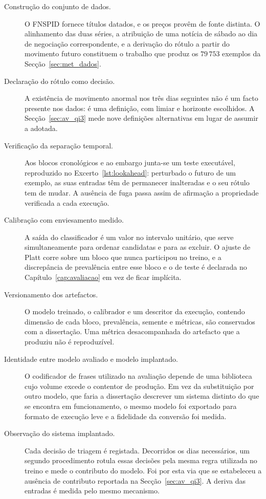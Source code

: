 \begin{description}
  \item[Construção do conjunto de dados.] O \gls{FNSPID} fornece títulos datados, e os preços
        provêm de fonte distinta. O alinhamento das duas séries, a atribuição de uma notícia de
        sábado ao dia de negociação correspondente, e a derivação do rótulo a partir do movimento
        futuro constituem o trabalho que produz os $79\,753$ exemplos da
        Secção~\ref{sec:met_dados}.

  \item[Declaração do rótulo como decisão.] A existência de movimento anormal nos três dias
        seguintes não é um facto presente nos dados: é uma definição, com limiar e horizonte
        escolhidos. A Secção~\ref{sec:av_qi3} mede nove definições alternativas em lugar de
        assumir a adotada.

  \item[Verificação da separação temporal.] Aos blocos cronológicos e ao embargo junta-se um
        teste executável, reproduzido no Excerto~\ref{lst:lookahead}: perturbado o futuro de um
        exemplo, as suas entradas têm de permanecer inalteradas e o seu rótulo tem de mudar. A
        ausência de fuga passa assim de afirmação a propriedade verificada a cada execução.

  \item[Calibração com enviesamento medido.] A saída do classificador é um valor no intervalo
        unitário, que serve simultaneamente para ordenar candidatas e para as excluir. O ajuste de
        Platt corre sobre um bloco que nunca participou no treino, e a discrepância de prevalência
        entre esse bloco e o de teste é declarada no Capítulo~\ref{cap:avaliacao} em vez de ficar
        implícita.

  \item[Versionamento dos artefactos.] O modelo treinado, o calibrador e um descritor da execução,
        contendo dimensão de cada bloco, prevalência, semente e métricas, são conservados com a
        dissertação.
        Uma métrica desacompanhada do artefacto que a produziu não é reproduzível.

  \item[Identidade entre modelo avaliado e modelo implantado.] O codificador de frases utilizado
        na avaliação depende de uma biblioteca cujo volume excede o contentor de produção. Em vez
        da substituição por outro modelo, que faria a dissertação descrever um sistema distinto do
        que se encontra em funcionamento, o mesmo modelo foi exportado para formato de execução
        leve e a fidelidade da conversão foi medida.

  \item[Observação do sistema implantado.] Cada decisão de triagem é registada. Decorridos os dias
        necessários, um segundo procedimento rotula essas decisões pela mesma regra utilizada no
        treino e mede o contributo do modelo. Foi por esta via que se estabeleceu a ausência de
        contributo reportada na Secção~\ref{sec:av_qi3}. A deriva das entradas é medida pelo mesmo
        mecanismo.
\end{description}

